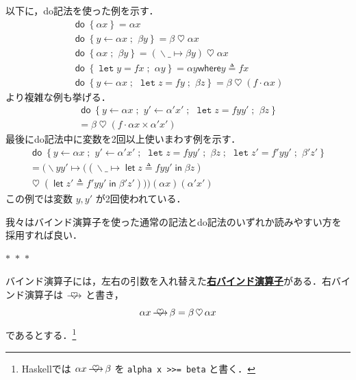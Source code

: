 \documentclass[a5paper,twoside,fleqn,draft]{jsbook}
\newcommand{\separator}{\begin{center}$*$~$*$~$*$\end{center}}
\newcommand{\programminglanguage}[1]{\textsf{#1}}
\newcommand{\haskell}{\programminglanguage{Haskell}}
\newcommand{\keyword}[1]{{\underline{\textbf{#1}}}}
\newcommand{\code}[1]{\texttt{#1}}
\newcommand{\mKeyword}[1]{\mathsf{#1}}
\newcommand{\mVarKeyword}[1]{\texttt{#1}}
\newcommand{\mDoKeyword}{\mKeyword{do}}
\newcommand{\mDoLetKeyword}{\mVarKeyword{let}}
\newcommand{\mInKeyword}{\mKeyword{in}}
\newcommand{\mLetKeyword}{\mKeyword{let}}
\newcommand{\mWhereKeyword}{\mKeyword{where}}
\DeclareMathOperator{\mDoKW}{\mDoKeyword}
\DeclareMathOperator{\mLet}{\mLetKeyword}
\DeclareMathOperator{\mLetIn}{\mInKeyword}
\DeclareMathOperator{\mAppMap}{\times}
\DeclareMathOperator{\mBind}{\heartsuit}
\DeclareMathOperator{\mBindRight}{\ooalign{$\longrightarrow$\crcr\hss$\mBind$\hss}}
\DeclareMathOperator{\mDoEq}{\leftarrow}
\DeclareMathOperator{\mDoLetEq}{\mVarKeyword{=}}
\DeclareMathOperator{\mDoNext}{;\;}
\DeclareMathOperator{\mLambda}{\backslash}
\DeclareMathOperator{\mLambdaArrow}{\mapsto}
\DeclareMathOperator{\mLetEq}{\triangleq}
\DeclareMathOperator{\mMap}{\cdot}
\newcommand{\mDo}[1]{\mDoKW\left\{#1\right\}}
\newcommand{\mDoLet}[2]{\mathop{\mDoLetKeyword}#1\mDoLetEq#2}
\newcommand{\mLambdaEXP}[2]{\mLambda{#1}\mLambdaArrow{#2}} %
\newcommand{\mLetInEXP}[3]{\mLet#1\mLetEq#2\mLetIn{#3}} %
\newcommand{\mWhereIsEXP}[2]{\mathbin{\mWhereKeyword}#1\mLetEq#2} %
\begin{document}
以下に，do記法を使った例を示す．
\begin{gather}
\mDo{\alpha x}=\alpha x\\
\mDo{y\mDoEq\alpha x\mDoNext\beta y}=\beta\mBind\alpha x\\
\mDo{\alpha x\mDoNext\beta y}=(\mLambdaEXP{\_}{\beta y})\mBind \alpha x\label{eq:do-alpha-beta}\\
\mDo{\mDoLet{y}{fx}\mDoNext\alpha y}=\alpha y\mWhereIsEXP{y}{fx}\\
\mDo{y\mDoEq\alpha x\mDoNext\mDoLet{z}{fy}\mDoNext\beta z}
=\beta\mBind{}(f\mMap\alpha x)
\end{gather}
より複雑な例も挙げる．
\begin{multline}
\mDo{y\mDoEq\alpha x\mDoNext y'\mDoEq\alpha'x'\mDoNext\mDoLet{z}{fyy'}
\mDoNext\beta z}\\
=\beta\mBind{}(f\mMap\alpha x\mAppMap\alpha'x')
\end{multline}
最後にdo記法中に変数を2回以上使いまわす例を示す．
\begin{multline}
\mDo{y\mDoEq\alpha x\mDoNext y'\mDoEq\alpha'x'\mDoNext\mDoLet{z}{fyy'}\mDoNext\beta z\mDoNext\mDoLet{z'}{f'yy'}\mDoNext\beta'z'}\\
=(\mLambda yy'\mLambdaArrow{}((\mLambdaEXP{\_}{\mLetInEXP{z}{fyy'}{\beta z}})\\
\mBind{}(\mLetInEXP{z'}{f'yy'}{\beta'z'}))) (\alpha x)(\alpha'x')
\end{multline}
この例では変数 $y,y'$ が2回使われている．


我々はバインド演算子を使った通常の記法とdo記法のいずれか読みやすい方を採用すれば良い．



\separator

バインド演算子には，左右の引数を入れ替えた\keyword{右バインド演算子}がある．右バインド演算子は $\mBindRight$ と書き，
\begin{equation}
\alpha x\mBindRight\beta=\beta\mBind\alpha x
\end{equation}
であるとする．\footnote{\haskell では $\alpha x\mBindRight\beta$ を \code{alpha x >>= beta} と書く．}
\end{document}
